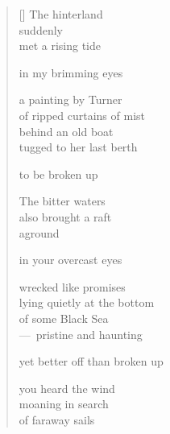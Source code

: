 \documentclass[12pt,a4paper]{article}
\begin{document}
\thispagestyle{empty}

\poemtitle{}

\settowidth{\versewidth}{yet better off than broken up}

\bigskip

\begin{verse}[\versewidth]
The hinterland \\
suddenly \\
met a rising tide

in my brimming eyes

a painting by Turner \\
of ripped curtains of mist \\
behind an old boat \\
tugged to her last berth

to be broken up

The bitter waters \\
also brought a raft \\
aground

in your overcast eyes

wrecked like promises \\
lying quietly at the bottom \\
of some Black Sea \\
---~pristine and haunting

yet better off than broken up

you heard the wind \\
moaning in search \\
of faraway sails
\end{verse}
\end{document}
